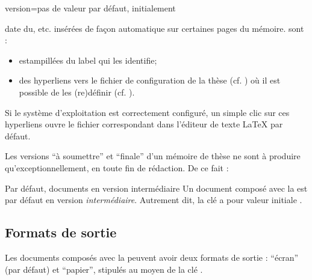 {\begin{docKey}{version}{=\textbar{}\textbar{}\textbar{}\textbar{}\textbar{}}{pas
      de valeur par défaut, initialement }
\begin{description}
\begin{itemize}
\begin{enumerate}
\begin{enumerate}
{{                date du}, etc. insérées de façon automatique sur certaines pages
              du mémoire.} sont :
            \begin{itemize}
            \item estampillées du label qui les identifie;
            \item des hyperliens vers le fichier de configuration de la thèse
              (cf.  ) où il est possible de les
              (re)définir (cf. ).
            \end{itemize}
          \end{enumerate}
          Si le système d'exploitation est correctement configuré, un simple
          clic sur ces hyperliens ouvre le fichier correspondant dans l'éditeur
          de texte \LaTeX{} par défaut.
        \end{enumerate}
      \end{itemize}
    \end{description}
  \end{docKey}
}

Les versions \enquote{à soumettre} et \enquote{finale} d'un mémoire de thèse ne
sont à produire qu'exceptionnellement, en toute fin de rédaction. De ce fait :
\begin{dbwarning}{Par défaut, documents en version intermédiaire}{}
  Un document composé avec la \yatCl{} est par défaut en version
  \emph{intermédiaire}. Autrement dit, la clé  a pour valeur
  initiale .
\end{dbwarning}

\subsection{Formats de sortie}
\label{sec-formats-de-sortie}
%

Les documents composés avec la \yatCl{} peuvent avoir deux formats de sortie :
\enquote{écran} (par défaut) et \enquote{papier}, stipulés au moyen de la clé
.

